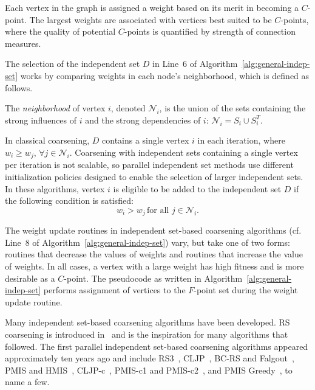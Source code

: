 \documentclass{elsart}
\begin{document}
Each vertex in the graph is assigned a weight based on its merit in
becoming a $C$-point. The largest weights are associated with vertices
best suited to be $C$-points, where the quality of potential
$C$-points is quantified by strength of connection measures.

The selection of the independent set $D$ in Line~6 of
Algorithm~\ref{alg:general-indep-set} works by comparing weights in
each node's neighborhood, which is defined as follows.
\begin{defn}
\label{def:neighborhood}
The \emph{neighborhood} of vertex $i$, denoted $\mathcal{N}_i$, is the
union of the sets containing the strong influences of $i$ and the
strong dependencies of $i$: $\mathcal{N}_i = S_i \cup S_i^T$.
\end{defn}

In classical coarsening, $D$ contains a single vertex $i$ in each
iteration, where $w_i \ge w_j,\, \forall j \in
\mathcal{N}_i$. Coarsening with independent sets containing a single
vertex per iteration is not scalable, so parallel independent set
methods use different initialization policies designed to enable the
selection of larger independent sets. In these algorithms, vertex $i$
is eligible to be added to the independent set $D$ if the following
condition is satisfied:
\begin{equation}
  \label{eq:D-selection}
  w_i > w_j\, \textrm{for all } j \in \mathcal{N}_i.
\end{equation}

The weight update routines in independent set-based coarsening
algorithms (cf. Line~8 of
Algorithm~\ref{alg:general-indep-set}) vary, but take one of two
forms: routines that decrease the values of weights and routines that
increase the value of weights. In all cases, a vertex with a large
weight has high fitness and is more desirable as a $C$-point. The
pseudocode as written in Algorithm~\ref{alg:general-indep-set} performs
assignment of vertices to the $F$-point set during the weight
update routine.

Many independent set-based coarsening algorithms have been
developed. RS coarsening is introduced in~\cite{Ruge1987} and is the
inspiration for many algorithms that followed. The first parallel
independent set-based coarsening algorithms appeared approximately ten
years ago and include RS3~\cite{Henson2002}, CLJP~\cite{Cleary1998},
BC-RS and Falgout~\cite{Henson2002}, PMIS and HMIS~\cite{Sterck2006},
CLJP-c~\cite{alber-cljpc}, PMIS-c1 and PMIS-c2~\cite{alber-PCGS}, and
PMIS Greedy~\cite{Butler2006}, to name a few.
\end{document}
